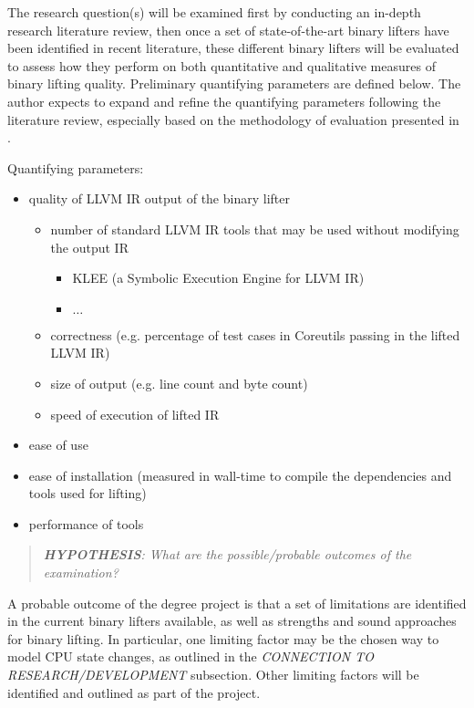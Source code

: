 \documentclass[12pt, a4paper]{article}
\begin{document}
The research question(s) will be examined first by conducting an in-depth research literature review, then once a set of state-of-the-art binary lifters have been identified in recent literature, these different binary lifters will be evaluated to assess how they perform on both quantitative and qualitative measures of binary lifting quality. Preliminary quantifying parameters are defined below. The author expects to expand and refine the quantifying parameters following the literature review, especially based on the methodology of evaluation presented in \cite{evaluation_of_irs}.

Quantifying parameters:
\begin{itemize}
	\item quality of LLVM IR output of the binary lifter
	\begin{itemize}
		\item number of standard LLVM IR tools that may be used without modifying the output IR
		\begin{itemize}
			\item KLEE (a Symbolic Execution Engine for LLVM IR)
			\item $\dots$
		\end{itemize}
		\item correctness (e.g. percentage of test cases in Coreutils passing in the lifted LLVM IR)
		\item size of output (e.g. line count and byte count)
		\item speed of execution of lifted IR
	\end{itemize}
	\item ease of use
	\item ease of installation (measured in wall-time to compile the dependencies and tools used for lifting)
	\item performance of tools
\end{itemize}

\begin{quote}
	\textit{\textbf{HYPOTHESIS}: What are the possible/probable outcomes of the examination?}
\end{quote}

A probable outcome of the degree project is that a set of limitations are identified in the current binary lifters available, as well as strengths and sound approaches for binary lifting. In particular, one limiting factor may be the chosen way to model CPU state changes, as outlined in the \textit{CONNECTION TO RESEARCH/DEVELOPMENT} subsection. Other limiting factors will be identified and outlined as part of the project.
\end{document}
